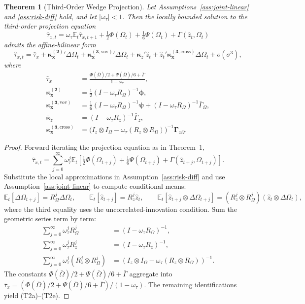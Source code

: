 \documentclass[11pt]{article}
\newcommand{\E}{\mathbb{E}}
\newcommand{\bs}[1]{\boldsymbol{#1}}
\newcommand{\kxtwo}{\kappa_x^{(2)}}
\newcommand{\kxvov}{\kappa_x^{(3,\mathrm{vov})}}
\newcommand{\kxcross}{\kappa_x^{(3,\mathrm{cross})}}
\theoremstyle{plain}
\newtheorem{theorem}{Theorem}
\theoremstyle{definition}
\begin{document}
\begin{theorem}[Third-Order Wedge Projection]
\label{thm:third-order}
Let Assumptions~\ref{ass:joint-linear} and \ref{ass:risk-diff} hold,
and let $|\omega_\tau|<1$. Then the locally bounded solution to the
third-order projection equation
\[
\hat\tau_{x,t}=\omega_\tau\E_t\hat\tau_{x,t+1}
+\tfrac{1}{2}\Phi(\Omega_t)+\tfrac{1}{6}\Psi(\Omega_t)+\Gamma(\hat z_t,\Omega_t)
\]
admits the affine-bilinear form
\begin{equation}
\boxed{
\hat\tau_{x,t}
= \bar\tau_x
+ \bs{\kxtwo}{}'\Delta\Omega_t
+ \bs{\kxvov}{}'\Delta\Omega_t
+ \bar{\bs{\kappa}}_z'\hat z_t
+ \hat z_t'\bs{\kxcross}\Delta\Omega_t
+ o(\sigma^3)},
\tag{T2}
\end{equation}
where
\begin{align}
\bar\tau_x &=
\frac{\Phi(\bar\Omega)/2+\Psi(\bar\Omega)/6+\bar\Gamma}{1-\omega_\tau},
\tag{T2a}\\
\bs{\kxtwo} &= \tfrac{1}{2}(I-\omega_\tau R_\Omega)^{-1}\bs{\phi},
\tag{T2b}\\
\bs{\kxvov} &= \tfrac{1}{6}(I-\omega_\tau R_\Omega)^{-1}\bs{\psi}+(I-\omega_\tau
R_\Omega)^{-1}\bar\Gamma_\Omega,
\tag{T2c}\\
\bar{\bs{\kappa}}_z &= (I-\omega_\tau R_z)^{-1}\bar\Gamma_z,
\tag{T2d}\\
\bs{\kxcross} &= \big(I_z\otimes I_\Omega - \omega_\tau (R_z\otimes
R_\Omega)\big)^{-1}\bs{\Gamma}_{z\Omega}.
\tag{T2e}
\end{align}
\end{theorem}

\begin{proof}
Forward iterating the projection equation as in Theorem~1,
\[
\hat\tau_{x,t}
=\sum_{j=0}^{\infty}\omega_\tau^j\E_t\!\left[\tfrac{1}{2}\Phi(\Omega_{t+j})
+\tfrac{1}{6}\Psi(\Omega_{t+j})+\Gamma(\hat z_{t+j},\Omega_{t+j})\right].
\]
Substitute the local approximations in
Assumption~\ref{ass:risk-diff} and use Assumption~\ref{ass:joint-linear} to
compute conditional means:
\[
\E_t[\Delta\Omega_{t+j}]=R_\Omega^j\Delta\Omega_t,
\qquad
\E_t[\hat z_{t+j}]=R_z^j\hat z_t,
\qquad
\E_t[\hat z_{t+j}\otimes\Delta\Omega_{t+j}]=(R_z^j\otimes R_\Omega^j)(\hat
z_t\otimes\Delta\Omega_t),
\]
where the third equality uses the uncorrelated-innovation condition. Sum the
geometric series term by term:
\begin{align*}
\sum_{j=0}^\infty\omega_\tau^j R_\Omega^j &= (I-\omega_\tau R_\Omega)^{-1},\\
\sum_{j=0}^\infty\omega_\tau^j R_z^j &= (I-\omega_\tau R_z)^{-1},\\
\sum_{j=0}^\infty\omega_\tau^j (R_z^j\otimes R_\Omega^j)
&= (I_z\otimes I_\Omega-\omega_\tau (R_z\otimes R_\Omega))^{-1}.
\end{align*}
The constants $\Phi(\bar\Omega)/2+\Psi(\bar\Omega)/6+\bar\Gamma$ aggregate
into $\bar\tau_x = (\Phi(\bar\Omega)/2+\Psi(\bar\Omega)/6+\bar\Gamma)/(1-\omega_\tau)$.
The remaining identifications yield (T2a)--(T2e).
\end{proof}
\end{document}
